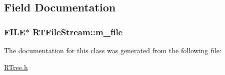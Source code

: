 \subsection{Field Documentation}
\hypertarget{classRTFileStream_a835f8a26bae1528a3cfcbc13db62548d}{
\subsubsection[{m\-\_\-file}]{\setlength{\rightskip}{0pt plus 5cm}F\-I\-L\-E$\ast$ R\-T\-File\-Stream\-::m\-\_\-file\hspace{0.3cm}{\ttfamily [private]}}}\label{classRTFileStream_a835f8a26bae1528a3cfcbc13db62548d}


The documentation for this class was generated from the following file\-:\begin{DoxyCompactItemize}
\item 
\hyperlink{RTree_8h}{R\-Tree.\-h}\end{DoxyCompactItemize}
